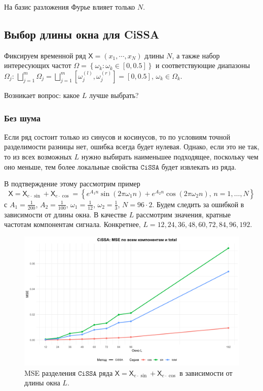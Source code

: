 \documentclass[12pt, specialist, subf
]{disser}
\theoremstyle{definition}
\newcommand{\CISSA}{\texttt{CiSSA}}
\newcommand{\TS}{\mathsf{X}}
\begin{document}
На базис разложения Фурье влияет только $N$.


\subsection{Выбор длины окна для CiSSA}
\label{subsec:cissa_L_choice}

Фиксируем временной ряд $\TS = \left(x_1, \cdots, x_N\right)$ длины $N$, а также набор интересующих частот $\Omega = \left\{\omega_k: \omega_k \in [0, 0.5] \right\}$ и соответствующие диапазоны $\Omega_j$:
		      $\bigsqcup \limits_{j=1}^m \Omega_j =
			      \bigsqcup \limits_{j=1}^m
			      \left[ \omega_j^{(l)}, \omega_j^{(r)} \right] =
			      [0, 0.5]$, $\omega_k \in \Omega_k$.

Возникает вопрос: какое $L$ лучше выбрать?

\subsubsection*{Без шума}

Если ряд состоит только из синусов и косинусов, то по условиям точной разделимости разницы нет, ошибка всегда будет нулевая. Однако, если это не так, то из всех возможных $L$ нужно выбирать наименьшее подходящее, поскольку чем оно меньше, тем более локальные свойства $\CISSA$ будет извлекать из ряда.

В подтверждение этому рассмотрим пример 
\[\TS = \TS_{e\cdot\sin} + \TS_{e\cdot\cos} =  \left\{ e^{A_1 n } \sin(2\pi \omega_1 n ) + e^{A_2 n} \cos(2\pi \omega_2 n ), \, n = 1, \dots, N \right\} \]
 с $A_1 = \frac{1}{200}$, $A_2 = \frac{1}{100}$, $\omega_1 = \frac{1}{12}$, $\omega_2 = \frac{1}{3}$, $N = 96 \cdot 2$. Будем следить за ошибкой в зависимости от длины окна. В качестве $L$ рассмотрим значения, кратные частотам компонентам сигнала. Конкретнее,  $L = 12, 24, 36, 48, 60, 72, 84, 96, 192$.

\begin{figure}[H]
	\centering
	\includegraphics[width=1\textwidth]{img/cissa_errors_plot.png}
	\caption{MSE разделения $\CISSA$ ряда $\TS = \TS_{e\cdot\sin} + \TS_{e\cdot\cos}$ в зависимости от длины окна $L$.}
	\label{fig:cissa_error_depends_on_L}
\end{figure}
\end{document}
